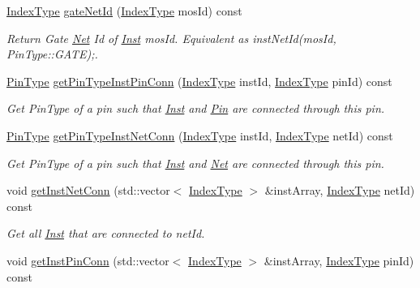 \begin{DoxyCompactItemize}
\hyperlink{type_8h_a581e8093e28e7362f2b6937296190676}{Index\+Type} \hyperlink{classNetlist_a6c248fed42772e11d054d8dccb720005}{gate\+Net\+Id} (\hyperlink{type_8h_a581e8093e28e7362f2b6937296190676}{Index\+Type} mos\+Id) const
\begin{DoxyCompactList}\small\item\em Return Gate \hyperlink{classNet}{Net} Id of \hyperlink{classInst}{Inst} mos\+Id. Equivalent as inst\+Net\+Id(mos\+Id, Pin\+Type\+::\+G\+A\+T\+E);. \end{DoxyCompactList}\item 
\hyperlink{type_8h_afaab50027002ecbb6c8ac27e727d1bb4}{Pin\+Type} \hyperlink{classNetlist_a27d477f7bd6fffd915015dbd3b3a0649}{get\+Pin\+Type\+Inst\+Pin\+Conn} (\hyperlink{type_8h_a581e8093e28e7362f2b6937296190676}{Index\+Type} inst\+Id, \hyperlink{type_8h_a581e8093e28e7362f2b6937296190676}{Index\+Type} pin\+Id) const
\begin{DoxyCompactList}\small\item\em Get Pin\+Type of a pin such that \hyperlink{classInst}{Inst} and \hyperlink{classPin}{Pin} are connected through this pin. \end{DoxyCompactList}\item 
\hyperlink{type_8h_afaab50027002ecbb6c8ac27e727d1bb4}{Pin\+Type} \hyperlink{classNetlist_a6bc6f9666ed8c833b967c38f2e164a1e}{get\+Pin\+Type\+Inst\+Net\+Conn} (\hyperlink{type_8h_a581e8093e28e7362f2b6937296190676}{Index\+Type} inst\+Id, \hyperlink{type_8h_a581e8093e28e7362f2b6937296190676}{Index\+Type} net\+Id) const
\begin{DoxyCompactList}\small\item\em Get Pin\+Type of a pin such that \hyperlink{classInst}{Inst} and \hyperlink{classNet}{Net} are connected through this pin. \end{DoxyCompactList}\item 
void \hyperlink{classNetlist_a3d210cdd4e0db6c7d4c0cdb5c7da5e4d}{get\+Inst\+Net\+Conn} (std\+::vector$<$ \hyperlink{type_8h_a581e8093e28e7362f2b6937296190676}{Index\+Type} $>$ \&inst\+Array, \hyperlink{type_8h_a581e8093e28e7362f2b6937296190676}{Index\+Type} net\+Id) const
\begin{DoxyCompactList}\small\item\em Get all \hyperlink{classInst}{Inst} that are connected to net\+Id. \end{DoxyCompactList}\item 
void \hyperlink{classNetlist_a422fb4c4465ac40da6d103e941621119}{get\+Inst\+Pin\+Conn} (std\+::vector$<$ \hyperlink{type_8h_a581e8093e28e7362f2b6937296190676}{Index\+Type} $>$ \&inst\+Array, \hyperlink{type_8h_a581e8093e28e7362f2b6937296190676}{Index\+Type} pin\+Id) const

\end{DoxyCompactItemize}
